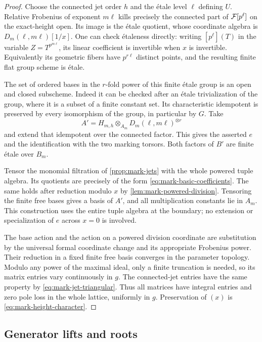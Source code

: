 \begin{proof}
Choose the connected jet order $h$ and the \'{e}tale level $\ell$
defining $U$.  Relative Frobenius of exponent $m\ell$ kills precisely
the connected part of $\mathcal F[p^\ell]$ on the exact-height open.  Its
image is the \'{e}tale quotient, whose coordinate algebra is
$D_m(\ell,m\ell)[1/x]$.  One can check \'{e}taleness directly: writing
$[p^\ell](T)$ in the variable $Z=T^{p^{m\ell}}$, its linear coefficient
is invertible when $x$ is invertible.  Equivalently its geometric
fibers have $p^{r\ell}$ distinct points, and the resulting finite
flat group scheme is \'{e}tale.

The set of ordered bases in the $r$-fold power of this finite
\'{e}tale group is an open and closed subscheme.  Indeed it can be
checked after an \'{e}tale trivialization of the group, where it is a
subset of a finite constant set.  Its characteristic idempotent is
preserved by every isomorphism of the group, in particular by $G$.
Take
\[
 A'=H_{m,h}\otimes_{A_m}D_m(\ell,m\ell)^{\otimes r}
\]
and extend that idempotent over the connected factor.  This gives
the asserted $e$ and the identification with the two marking
torsors.  Both factors of $B'$ are finite \'{e}tale over $B_m$.

Tensor the monomial filtration of \cref{prop:mark-jets} with the whole
powered tuple algebra.  Its quotients are precisely of the form
\cref{eq:mark-basic-coefficients}.  The same holds after reduction
modulo $x$ by \cref{lem:mark-powered-division}.  Tensoring the finite
free bases gives a basis of $A'$, and all multiplication constants
lie in $A_m$.  This construction uses the entire tuple algebra at
the boundary; no extension or specialization of $e$ across $x=0$
is involved.

The base action and the action on a powered division coordinate
are substitution by the universal formal coordinate change and
its appropriate Frobenius power.  Their reduction in a fixed
finite free basis converges in the parameter topology.  Modulo
any power of the maximal ideal, only a finite truncation is
needed, so its matrix entries vary continuously in $g$.  The
connected-jet entries have the same property by
\cref{eq:mark-jet-triangular}.  Thus all matrices have integral
entries and zero pole loss in the whole lattice, uniformly in
$g$.  Preservation of $(x)$ is \cref{eq:mark-height-character}.
\end{proof}

\subsection{Generator lifts and roots}

